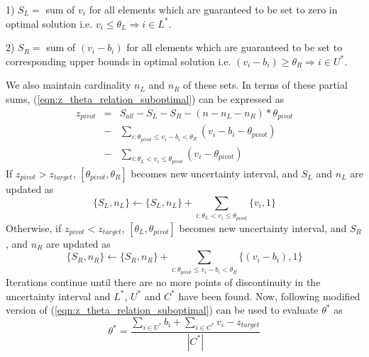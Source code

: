 \documentclass{article}
\begin{document}
1) $S_L = $ sum of $v_i$ for all elements which are guaranteed to be set to zero in optimal solution i.e. $v_i \le \theta_L \Rightarrow i \in L^*$.

2) $S_R = $ sum of $(v_i - b_i)$ for all elements which are guaranteed to be set to corresponding upper bounds in optimal solution i.e. $(v_i - b_i) \ge \theta_R \Rightarrow i \in U^*$.

We also maintain cardinality  $n_L$ and $n_R$ of these sets. In terms of these partial sums, (\ref{eqn:z_theta_relation_suboptimal}) can be expressed as
\begin{eqnarray}\label{eqn:z_theta_relation_optimal}
    z_{pivot} &=& S_{all} - S_L - S_R  - ( n - n_L - n_R ) * \theta_{pivot} \\ \nonumber
    &-& \sum_{i : \theta_{pivot} \le v_i - b_i < \theta_R} ( v_i - b_i - \theta_{pivot} ) \\ \nonumber
    &-& \sum_{i : \theta_L < v_i \le \theta_{pivot}} ( v_i - \theta_{pivot} )
\end{eqnarray}
If $z_{pivot} > z_{target}$,  $[\theta_{pivot}, \theta_R]$ becomes new uncertainty interval, and $S_L$ and $n_L$ are updated as
\begin{equation}\label{eqn:S_L_update}
    \{S_L,n_L\} \leftarrow \{S_L,n_L\} +   \sum_{i : \theta_L < v_i \le \theta_{pivot}} \{v_i,1\}
\end{equation}
Otherwise, if $z_{pivot} < z_{target}$, $[\theta_L, \theta_{pivot}]$ becomes new uncertainty interval, and $S_R$, and $n_R$ are updated as
\begin{equation}\label{eqn:S_R_update}
    \{S_R,n_R\} \leftarrow \{S_R,n_R\} +   \sum_{i : \theta_{pivot} \le v_i - b_i < \theta_R} \{(v_i-b_i),1\}
\end{equation}
Iterations continue until there are no more points of discontinuity in the uncertainty interval and $L^*$, $U^*$ and $C^*$ have been found. Now, following modified version of (\ref{eqn:z_theta_relation_suboptimal}) can be used to evaluate $\theta^*$ as
\begin{equation}\label{eqn:theta_star}
\theta^* = \frac{\sum_{i \in U^*} b_i + \sum_{i \in C^*} v_i - z_{target}}{| C^* |}
\end{equation}
\end{document}
